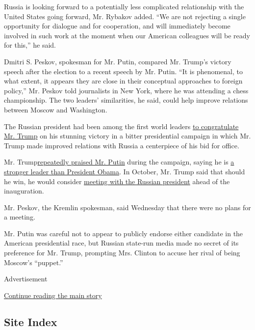 Russia is looking forward to a potentially less complicated relationship
with the United States going forward, Mr. Rybakov added. ``We are not
rejecting a single opportunity for dialogue and for cooperation, and
will immediately become involved in such work at the moment when our
American colleagues will be ready for this,'' he said.

Dmitri S. Peskov, spokesman for Mr. Putin, compared Mr. Trump's victory
speech after the election to a recent speech by Mr. Putin. ``It is
phenomenal, to what extent, it appears they are close in their
conceptual approaches to foreign policy,'' Mr. Peskov told journalists
in New York, where he was attending a chess championship. The two
leaders' similarities, he said, could help improve relations between
Moscow and Washington.

The Russian president had been among the first world leaders
\href{http://www.nytimes.com/2016/11/10/world/europe/russia-putin-donald-trump.html}{to
congratulate Mr. Trump} on his stunning victory in a bitter presidential
campaign in which Mr. Trump made improved relations with Russia a
centerpiece of his bid for office.

Mr.
Trump\href{http://www.nytimes.com/2016/07/26/us/politics/kremlin-donald-trump-vladimir-putin.html}{repeatedly
praised Mr. Putin} during the campaign, saying he is
\href{http://www.nytimes.com/2016/09/09/us/politics/donald-trump-vladimir-putin.html}{a
stronger leader than President Obama}. In October, Mr. Trump said that
should he win, he would consider
\href{http://www.nytimes.com/2016/10/18/us/politics/russia-putin-trump.html}{meeting
with the Russian president} ahead of the inauguration.

Mr. Peskov, the Kremlin spokesman, said Wednesday that there were no
plans for a meeting.

Mr. Putin was careful not to appear to publicly endorse either candidate
in the American presidential race, but Russian state-run media made no
secret of its preference for Mr. Trump, prompting Mrs. Clinton to accuse
her rival of being Moscow's ``puppet.''

Advertisement

\protect\hyperlink{after-bottom}{Continue reading the main story}

\hypertarget{site-index}{%
\subsection{Site Index}\label{site-index}}

